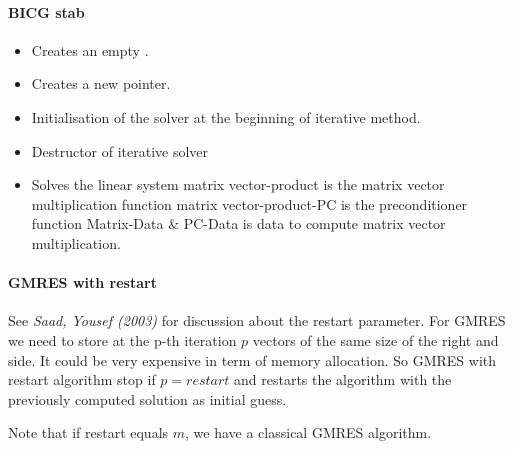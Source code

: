 \paragraph{BICG stab}
\begin{itemize}
  \item {}
    \sshortdescribe Creates an empty .  
\item {}
  \sshortdescribe Creates a new  pointer.  
\item {}
  \sshortdescribe Initialisation of the solver at the beginning of iterative method.  
\item {}
  \sshortdescribe Destructor of iterative solver  
\item {}
  \sshortdescribe Solves the linear system matrix vector-product is the matrix vector multiplication function matrix vector-product-PC is the preconditioner function Matrix-Data \& PC-Data is data to compute matrix vector multiplication.  
\end{itemize}

\paragraph{GMRES with restart} See {\em Saad, Yousef (2003)} for discussion
about the restart parameter. For GMRES we need to store at the p-th iteration
$p$ vectors of the same size of the right and side. It could be very expensive
in term of memory allocation. So GMRES with restart algorithm stop if
$p=restart$ and restarts the algorithm with the previously computed solution
as initial guess.

Note that if restart equals $m$, we have a classical GMRES algorithm.

